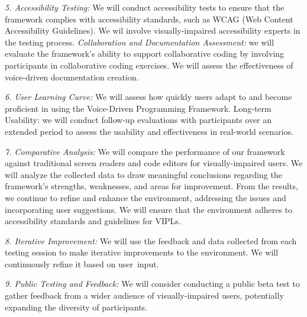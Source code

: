 {\em 5. Accessibility Testing:} We will conduct accessibility tests to ensure
that the framework complies with accessibility standards, such as WCAG
(Web Content Accessibility Guidelines). We wil involve visually-impaired
accessibility experts in the testing process. {\em Collaboration and
  Documentation Assessment:} we will evaluate the framework's ability to
support collaborative coding by involving participants in
collaborative coding exercises. We will assess the effectiveness of
voice-driven documentation creation.

{\em 6. User Learning Curve:} We will assess how quickly users adapt
to and become proficient in using the Voice-Driven Programming
Framework. Long-term Usability: we will conduct follow-up evaluations
with participants over an extended period to assess the usability and
effectiveness in real-world scenarios.

{\em 7. Comparative Analysis:} We will compare the performance of our
framework against traditional screen readers and code editors for
visually-impaired users. We will analyze the collected data to draw
meaningful conclusions regarding the framework's strengths,
weaknesses, and areas for improvement.
From the results, we continue to refine and enhance the
environment, addressing the issues and incorporating user
suggestions. We will ensure that the environment adheres to accessibility
standards and guidelines for VIPLs.

{\em 8. Iterative Improvement:} We will use the feedback and data collected
from each testing session to make iterative improvements to the
environment. We will continuously refine it
based on user~input.

{\em 9. Public Testing and Feedback:} We will consider conducting a
public beta test to gather feedback from a wider audience of
visually-impaired users, potentially expanding the diversity of
participants.





